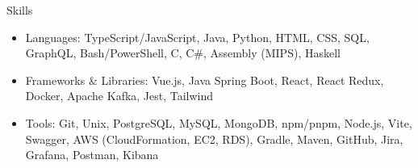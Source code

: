 \documentclass[]{mcdowellcv}
\begin{document}
	\begin{cvsection}{Skills}
		\begin{cvsubsection}{}{}{}	
			\begin{itemize}
				\item Languages: TypeScript/JavaScript, Java, Python, HTML, CSS, SQL, GraphQL, Bash/PowerShell, C, C\#, Assembly (MIPS), Haskell 
				\item Frameworks \& Libraries: Vue.js, Java Spring Boot, React, React Redux, Docker, Apache Kafka, Jest, Tailwind
				\item Tools: Git, Unix, PostgreSQL, MySQL, MongoDB, npm/pnpm, Node.js, Vite, Swagger, AWS (CloudFormation, EC2, RDS), Gradle, Maven, GitHub, Jira, Grafana, Postman, Kibana
			\end{itemize}
		\end{cvsubsection}
	\end{cvsection}
	
\end{document}
